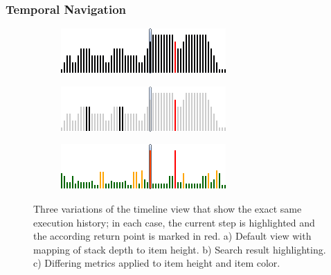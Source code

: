 \subsubsection{Temporal Navigation}
\begin{figure}[tb]
	\centering
	
	\begin{subfigure}[b]{0.45\textwidth}
		\centering
        \includegraphics[width=\textwidth]{../images/04-ImplTimeline1}
        \caption[Default View]{}
		\label{fig:ApproachTimelineDefault}
	\end{subfigure}
	\quad
	\begin{subfigure}[b]{0.45\textwidth}
		\centering
		\includegraphics[width=\textwidth]{../images/04-ImplTimeline2}
		\caption[Search Result Highlighting]{}
		\label{fig:ApproachTimelineSearch}
	\end{subfigure}
	\quad
	\begin{subfigure}[b]{0.45\textwidth}
		\centering
		\includegraphics[width=\textwidth]{../images/04-ImplTimeline3}
		\caption[Differing Metrics Applied to Item Height and Color]{}
		\label{fig:ApproachTimelineMetrics}
	\end{subfigure}
	
	\caption[Variations of the Timeline View]{Three variations of the timeline view that show the exact same execution history; in each case, the current step is highlighted and the according return point is marked in red.
		a) Default view with mapping of stack depth to item height.
		b) Search result highlighting.
		c) Differing metrics applied to item height and item color.
	}
	\label{fig:ApproachTimeline}
\end{figure}


